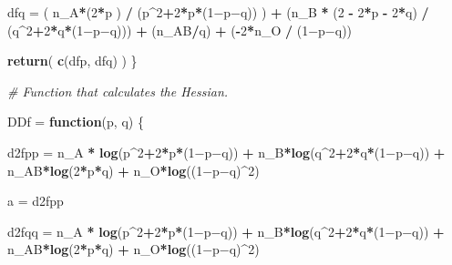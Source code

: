 \documentclass[]{article}
\newenvironment{Shaded}{\begin{snugshade}}{\end{snugshade}}
\newcommand{\KeywordTok}[1]{\textcolor[rgb]{0.13,0.29,0.53}{\textbf{#1}}}
\newcommand{\DecValTok}[1]{\textcolor[rgb]{0.00,0.00,0.81}{#1}}
\newcommand{\StringTok}[1]{\textcolor[rgb]{0.31,0.60,0.02}{#1}}
\newcommand{\CommentTok}[1]{\textcolor[rgb]{0.56,0.35,0.01}{\textit{#1}}}
\newcommand{\ControlFlowTok}[1]{\textcolor[rgb]{0.13,0.29,0.53}{\textbf{#1}}}
\newcommand{\OperatorTok}[1]{\textcolor[rgb]{0.81,0.36,0.00}{\textbf{#1}}}
\newcommand{\NormalTok}[1]{#1}
\begin{document}
\begin{Shaded}
\begin{Highlighting}[]
\NormalTok{  dfq =}\StringTok{   }\NormalTok{( n_A}\OperatorTok{*}\NormalTok{(}\DecValTok{2}\OperatorTok{*}\NormalTok{p ) }\OperatorTok{/}\StringTok{ }\NormalTok{(p}\OperatorTok{^}\DecValTok{2}\OperatorTok{+}\DecValTok{2}\OperatorTok{*}\NormalTok{p}\OperatorTok{*}\NormalTok{(}\DecValTok{1}\NormalTok{−p−q)) )   }
        \OperatorTok{+}\StringTok{ }\NormalTok{(n_B }\OperatorTok{*}\StringTok{ }\NormalTok{(}\DecValTok{2} \OperatorTok{-}\StringTok{ }\DecValTok{2}\OperatorTok{*}\NormalTok{p }\OperatorTok{-}\StringTok{ }\DecValTok{2}\OperatorTok{*}\NormalTok{q) }\OperatorTok{/}\StringTok{ }\NormalTok{(q}\OperatorTok{^}\DecValTok{2}\OperatorTok{+}\DecValTok{2}\OperatorTok{*}\NormalTok{q}\OperatorTok{*}\NormalTok{(}\DecValTok{1}\NormalTok{−p−q))) }
        \OperatorTok{+}\StringTok{ }\NormalTok{(n_AB}\OperatorTok{/}\NormalTok{q) }
        \OperatorTok{+}\StringTok{ }\NormalTok{(}\OperatorTok{-}\DecValTok{2}\OperatorTok{*}\NormalTok{n_O }\OperatorTok{/}\StringTok{ }\NormalTok{(}\DecValTok{1}\NormalTok{−p−q))}
  
  \KeywordTok{return}\NormalTok{( }\KeywordTok{c}\NormalTok{(dfp, dfq) )}
\NormalTok{\}}



\CommentTok{# Function that calculates the Hessian.}

\NormalTok{DDf =}\StringTok{ }\ControlFlowTok{function}\NormalTok{(p, q) \{}
  
\NormalTok{    d2fpp =}\StringTok{ }\NormalTok{n_A }\OperatorTok{*}\StringTok{ }\KeywordTok{log}\NormalTok{(p}\OperatorTok{^}\DecValTok{2}\OperatorTok{+}\DecValTok{2}\OperatorTok{*}\NormalTok{p}\OperatorTok{*}\NormalTok{(}\DecValTok{1}\NormalTok{−p−q)) }\OperatorTok{+}\StringTok{ }\NormalTok{n_B}\OperatorTok{*}\KeywordTok{log}\NormalTok{(q}\OperatorTok{^}\DecValTok{2}\OperatorTok{+}\DecValTok{2}\OperatorTok{*}\NormalTok{q}\OperatorTok{*}\NormalTok{(}\DecValTok{1}\NormalTok{−p−q)) }\OperatorTok{+}\StringTok{ }\NormalTok{n_AB}\OperatorTok{*}\KeywordTok{log}\NormalTok{(}\DecValTok{2}\OperatorTok{*}\NormalTok{p}\OperatorTok{*}\NormalTok{q) }\OperatorTok{+}\StringTok{ }\NormalTok{n_O}\OperatorTok{*}\KeywordTok{log}\NormalTok{((}\DecValTok{1}\NormalTok{−p−q)}\OperatorTok{^}\DecValTok{2}\NormalTok{) }

\NormalTok{    a =}\StringTok{ }\NormalTok{d2fpp}
    
\NormalTok{    d2fqq =}\StringTok{ }\NormalTok{n_A }\OperatorTok{*}\StringTok{ }\KeywordTok{log}\NormalTok{(p}\OperatorTok{^}\DecValTok{2}\OperatorTok{+}\DecValTok{2}\OperatorTok{*}\NormalTok{p}\OperatorTok{*}\NormalTok{(}\DecValTok{1}\NormalTok{−p−q)) }\OperatorTok{+}\StringTok{ }\NormalTok{n_B}\OperatorTok{*}\KeywordTok{log}\NormalTok{(q}\OperatorTok{^}\DecValTok{2}\OperatorTok{+}\DecValTok{2}\OperatorTok{*}\NormalTok{q}\OperatorTok{*}\NormalTok{(}\DecValTok{1}\NormalTok{−p−q)) }\OperatorTok{+}\StringTok{ }\NormalTok{n_AB}\OperatorTok{*}\KeywordTok{log}\NormalTok{(}\DecValTok{2}\OperatorTok{*}\NormalTok{p}\OperatorTok{*}\NormalTok{q) }\OperatorTok{+}\StringTok{ }\NormalTok{n_O}\OperatorTok{*}\KeywordTok{log}\NormalTok{((}\DecValTok{1}\NormalTok{−p−q)}\OperatorTok{^}\DecValTok{2}\NormalTok{)}


\end{Highlighting}
\end{Shaded}
\end{document}
